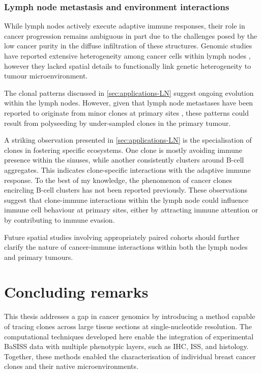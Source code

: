 \subsubsection*{Lymph node metastasis and environment interactions}

While lymph nodes actively execute adaptive immune responses, their role in cancer progression remains ambiguous in part due to the challenges posed by the low cancer purity in the diffuse infiltration of these structures. Genomic studies have reported extensive heterogeneity among cancer cells within lymph nodes \parencite{Pal2021-rf,Barry2018-el,Bao2018-kj}, however they lacked spatial details to functionally link genetic heterogeneity to tumour microenvironment.

The clonal patterns discussed in \cref{sec:applications-LN} suggest ongoing evolution within the lymph nodes. However, given that lymph node metastases have been reported to originate from minor clones at primary sites \parencite{Bao2018-kj}, these patterns could result from polyseeding by under-sampled clones in the primary tumour.

A striking observation presented in \cref{sec:applications-LN} is the specialisation of clones in fostering specific ecosystems. One clone is mostly avoiding immune presence within the sinuses, while another consistently clusters around B-cell aggregates. This indicates clone-specific interactions with the adaptive immune response. To the best of my knowledge, the phenomenon of cancer clones encircling B-cell clusters has not been reported previously. These observations suggest that clone-immune interactions within the lymph node could influence immune cell behaviour at primary sites, either by attracting immune attention or by contributing to immune evasion.

Future spatial studies involving appropriately paired cohorts should further clarify the nature of cancer-immune interactions within both the lymph nodes and primary tumours.

\section{Concluding remarks}
\label{sec:discussion-colcluding-remarks}
This thesis addresses a gap in cancer genomics by introducing a method capable of tracing clones across large tissue sections at single-nucleotide resolution. The computational techniques developed here enable the integration of experimental \ac{BaSISS} data with multiple phenotypic layers, such as \acl{IHC}, \acl{ISS}, and histology. Together, these methods enabled the characterisation of individual breast cancer clones and their native microenvironments. 

